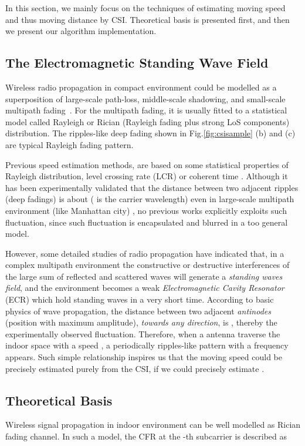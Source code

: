 In this section, we mainly focus on the techniques of estimating
moving speed and thus moving distance by CSI.
Theoretical basis is presented first, and then
 we present our algorithm implementation.


\subsection{The Electromagnetic Standing Wave Field}

Wireless radio propagation in compact environment could be modelled as a
superposition of large-scale path-loss, middle-scale shadowing, and small-scale
multipath fading~\cite{rappaport1996wireless}. For the multipath fading, it is
usually fitted to a statistical model called Rayleigh or Rician (Rayleigh fading
plus strong LoS components) distribution. The ripples-like deep fading shown in
Fig.\ref{fig:csisample} (b) and (c) are typical Rayleigh fading pattern.

Previous speed estimation methods, are based on some statistical properties of
Rayleigh distribution, \eg level crossing rate (LCR) or coherent time .
Although it has been experimentally validated that the distance between two
adjacent ripples (deep fadings) is about  ( is the carrier
wavelength) even in large-scale multipath environment (like Manhattan city)
\cite{sklar1997rayleigh}, no previous works explicitly exploits such 
fluctuation, since such fluctuation is encapsulated and blurred in a too general
model.

However, some detailed studies of radio
propagation\cite{braun1991physical,zonoozi1996shadow,chen1997sbr} have indicated
that, in a complex multipath environment the constructive or destructive
interferences of the large sum of reflected and scattered waves will generate a
\textit{standing waves field}, and the environment becomes a weak
\textit{Electromagnetic Cavity Resonator} (ECR) \cite{hill2009electromagnetic}
which hold standing waves in a very short time. According to basic physics of
wave propagation, the distance between two adjacent \textit{antinodes} (position
with maximum amplitude), \textit{towards any direction}, is , thereby
the experimentally observed  fluctuation.
Therefore, when a antenna traverse the indoor space with a speed , a
periodically ripples-like pattern with a frequency 
appears. Such simple relationship inspires us that the moving speed  could be
precisely estimated purely from the CSI, if we could precisely estimate .


\subsection{Theoretical Basis}
Wireless signal propagation in indoor environment can be well modelled
as Rician fading channel. In such a model, the CFR at the -th
subcarrier is described as \cite{ricianKestimate}

